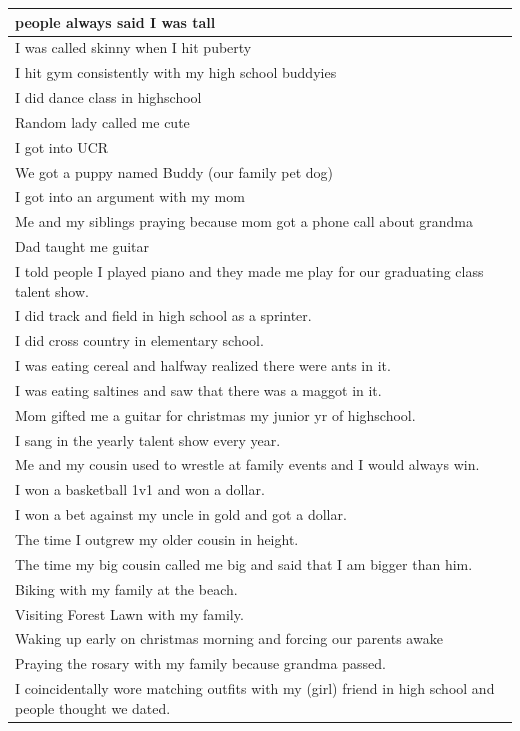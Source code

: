 \documentclass[
  .7em,
  letterpaper,
  DIV=11,
  numbers=noendperiod]{scrartcl}
\begin{document}
\begin{table}
\begin{tabular}{l}
\hline
people always said I was tall\\
\hline
I was called skinny when I hit puberty\\
\hline
I hit gym consistently with my high school buddyies\\
\hline
I did dance class in highschool\\
\hline
Random lady called me cute\\
\hline
I got into UCR\\
\hline
We got a puppy named Buddy (our family pet dog)\\
\hline
I got into an argument with my mom\\
\hline
Me and my siblings praying because mom got a phone call about grandma\\
\hline
Dad taught me guitar\\
\hline
I told people I played piano and they made me play for our graduating class talent show.\\
\hline
I did track and field in high school as a sprinter.\\
\hline
I did cross country in elementary school.\\
\hline
I was eating cereal and halfway realized there were ants in it.\\
\hline
I was eating saltines and saw that there was a maggot in it.\\
\hline
Mom gifted me a guitar for christmas my junior yr of highschool.\\
\hline
I sang in the yearly talent show every year.\\
\hline
Me and my cousin used to wrestle at family events and I would always win.\\
\hline
I won a basketball 1v1 and won a dollar.\\
\hline
I won a bet against my uncle in gold and got a dollar.\\
\hline
The time I outgrew my older cousin in height.\\
\hline
The time my big cousin called me big and said that I am bigger than him.\\
\hline
Biking with my family at the beach.\\
\hline
Visiting Forest Lawn with my family.\\
\hline
Waking up early on christmas morning and forcing our parents awake\\
\hline
Praying the rosary with my family because grandma passed.\\
\hline
I coincidentally wore matching outfits with my (girl) friend in high school and people thought we dated.\\

\end{tabular}
\end{table}
\end{document}
